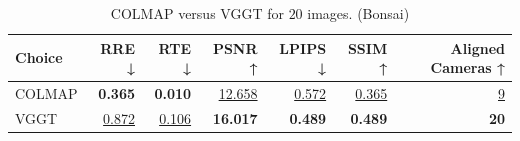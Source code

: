 \begin{table}[H]
\caption{COLMAP versus VGGT for $20$ images. (Bonsai)}
\label{tab:01_num_images_sparse_bonsai}
\centering
\scriptsize
\begin{tabular}{lrrrrrr}
\toprule
Choice & RRE ↓ & RTE ↓ & PSNR ↑ & LPIPS ↓ & SSIM ↑ & Aligned Cameras ↑ \\
\midrule
COLMAP & \textbf{0.365} & \textbf{0.010} & \underline{12.658} & \underline{0.572} & \underline{0.365} & \underline{9} \\
VGGT & \underline{0.872} & \underline{0.106} & \textbf{16.017} & \textbf{0.489} & \textbf{0.489} & \textbf{20} \\
\bottomrule
\end{tabular}
\end{table}